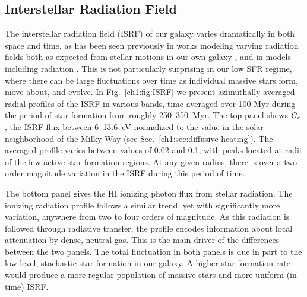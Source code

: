 \subsection{Interstellar Radiation Field}
\label{ch1:sec:ISRF}

The interstellar radiation field (ISRF) of our galaxy varies dramatically in both space and time, as has been seen previously in works modeling varying radiation fields both as expected from stellar motions in our own galaxy \citep{Parravano2003}, and in models including radiation \citep[e.g.][]{Hu2017}. This is not particularly surprising in our low SFR regime, where there can be large fluctuations over time as individual massive stars form, move about, and evolve. In Fig.~\ref{ch1:fig:ISRF} we present azimuthally averaged radial profiles of the ISRF in various bands, time averaged over 100 Myr during the period of star formation from roughly 250--350~Myr. The top panel shows $G_{\rm o}$, the ISRF flux between 6--13.6~eV normalized to the value in the solar neighborhood of the Milky Way (see Sec.~\ref{ch1:sec:diffusive heating}). The averaged profile varies between values of 0.02 and 0.1, with peaks located at radii of the few active star formation regions. At any given radius, there is over a two order magnitude variation in the ISRF during this period of time.

The bottom panel gives the HI ionizing photon flux from stellar radiation. The ionizing radiation profile follows a similar trend, yet with significantly more variation, anywhere from two to four orders of magnitude. As this radiation is followed through radiative transfer, the profile encodes information about local attenuation by dense, neutral gas. This is the main driver of the differences between the two panels. The total fluctuation in both panels is due in part to the low-level, stochastic star formation in our galaxy. A higher star formation rate would produce a more regular population of massive stars and more uniform (in time) ISRF.


